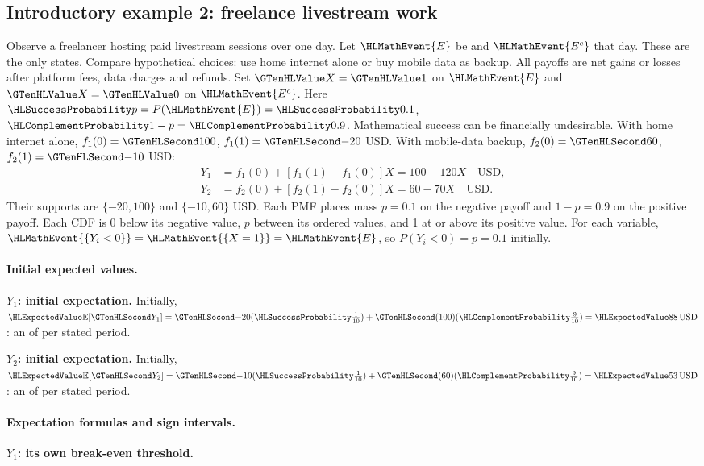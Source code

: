 \subsection{Introductory example 2: freelance livestream work}\label{ex:intro-two}
Observe a freelancer hosting paid livestream sessions over one day. Let $\HLMathEvent{E}$ be 
and $\HLMathEvent{E^c}$  that day. These are the only states. Compare hypothetical choices:
use home internet alone or buy mobile data as backup. All payoffs are net gains or losses
after platform fees, data charges and refunds. Set $\Indicator{X}=\Indicator{1}$ on $\HLMathEvent{E}$ and
$\Indicator{X}=\Indicator{0}$ on $\HLMathEvent{E^c}$. Here $\SuccessProb{p}=P(\HLMathEvent{E})=\SuccessProb{0.1}$,
$\FailureProb{1-p}=\FailureProb{0.9}$. Mathematical success can be financially undesirable.
With home internet alone, $f_1(0)=\Money{100}$, $f_1(1)=\Money{-20}$ USD.
With mobile-data backup, $f_2(0)=\Money{60}$, $f_2(1)=\Money{-10}$ USD:
\[
\begin{aligned}
Y_1&=f_1(0)+[f_1(1)-f_1(0)]X=100-120X\quad\text{USD},\\
Y_2&=f_2(0)+[f_2(1)-f_2(0)]X=60-70X\quad\text{USD}.
\end{aligned}
\]
Their supports are $\{-20,100\}$ and $\{-10,60\}$ USD. Each PMF places
mass $p=0.1$ on the negative payoff and $1-p=0.9$ on the positive payoff.
Each CDF is 0 below its negative value, $p$ between its ordered values,
and 1 at or above its positive value. For each variable,
$\HLMathEvent{\{Y_i<0\}}=\HLMathEvent{\{X=1\}}=\HLMathEvent{E}$, so $P(Y_i<0)=p=0.1$ initially.
\paragraph{Initial expected values.}
\textbf{$Y_1$: initial expectation.}
Initially, $\ExpectedValue{\mathbb E}[\Money{Y_1}]=\Money{-20}(\SuccessProb{\frac{1}{10}})+\Money{(100)}(\FailureProb{\frac{9}{10}})=\ExpectedValue{88\,\text{USD}}$:
an  of  per stated period.

\textbf{$Y_2$: initial expectation.}
Initially, $\ExpectedValue{\mathbb E}[\Money{Y_2}]=\Money{-10}(\SuccessProb{\frac{1}{10}})+\Money{(60)}(\FailureProb{\frac{9}{10}})=\ExpectedValue{53\,\text{USD}}$:
an  of  per stated period.
\paragraph{Expectation formulas and sign intervals.}
\textbf{$Y_1$: its own break-even threshold.}

